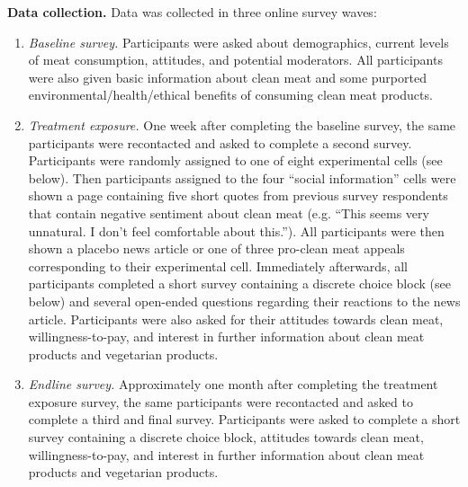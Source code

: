 \documentclass[12pt]{article}
\begin{document}

\textbf{Data collection.} Data was collected in three online survey waves:

\begin{enumerate}
    \item \textit{Baseline survey.} Participants were asked about demographics, current levels of meat consumption, attitudes, and potential moderators. All participants were also given basic information about clean meat and some purported environmental/health/ethical benefits of consuming clean meat products.
    
    \item \textit{Treatment exposure.} One week after completing the baseline survey, the same participants were recontacted and asked to complete a second survey. Participants were randomly assigned to one of eight experimental cells (see below). Then participants assigned to the four ``social information'' cells were shown a page containing five short quotes from previous survey respondents that contain negative sentiment about clean meat (e.g. ``This seems very unnatural. I don't feel comfortable about this.''). All participants were then shown a placebo news article or one of three pro-clean meat appeals corresponding to their experimental cell. Immediately afterwards, all participants completed a short survey containing a discrete choice block (see below) and several open-ended questions regarding their reactions to the news article. Participants were also asked for their attitudes towards clean meat, willingness-to-pay, and interest in further information about clean meat products and vegetarian products.
    
    \item \textit{Endline survey.} Approximately one month after completing the treatment exposure survey, the same participants were recontacted and asked to complete a third and final survey. Participants were asked to complete a short survey containing a discrete choice block, attitudes towards clean meat, willingness-to-pay, and interest in further information about clean meat products and vegetarian products.
\end{enumerate}
\end{document}
